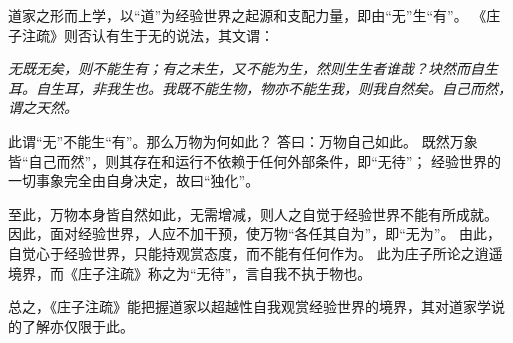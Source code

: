 \documentclass[11pt]{article}
\begin{document}
道家之形而上学，以“道”为经验世界之起源和支配力量，即由“无”生“有”。
《庄子注疏》则否认有生于无的说法，其文谓：

\textit{无既无矣，则不能生有；有之未生，又不能为生，然则生生者谁哉？块然而自生耳。自生耳，非我生也。我既不能生物，物亦不能生我，则我自然矣。自己而然，谓之天然。}

此谓“无”不能生“有”。那么万物为何如此？
答曰：万物自己如此。
既然万象皆“自己而然”，则其存在和运行不依赖于任何外部条件，即“无待”；
经验世界的一切事象完全由自身决定，故曰“独化”。

\newline

至此，万物本身皆自然如此，无需增减，则人之自觉于经验世界不能有所成就。
因此，面对经验世界，人应不加干预，使万物“各任其自为”，即“无为”。
由此，自觉心于经验世界，只能持观赏态度，而不能有任何作为。
此为庄子所论之逍遥境界，而《庄子注疏》称之为“无待”，言自我不执于物也。

\newline

总之，《庄子注疏》能把握道家以超越性自我观赏经验世界的境界，其对道家学说的了解亦仅限于此。  
  
\end{document}
